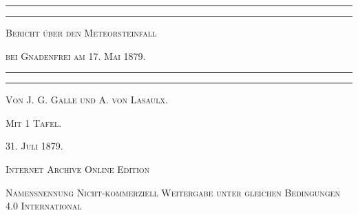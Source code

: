 \documentclass[a4paper, 11pt, oneside]{article}
\begin{document}
\begin{titlepage} %
	\centering %

	
	\rule{\textwidth}{1.6pt}\vspace*{-\baselineskip}\vspace*{2pt} %
	\rule{\textwidth}{0.4pt} %
	
	\vspace{1.5\baselineskip} %
	
	{\scshape\LARGE Bericht über den Meteorsteinfall}
	
	\vspace{1\baselineskip} %

	{\scshape\LARGE bei Gnadenfrei am 17. Mai 1879.}

	\vspace{1.5\baselineskip} %

	\rule{\textwidth}{0.4pt}\vspace*{-\baselineskip}\vspace{3.2pt} %
	\rule{\textwidth}{1.6pt} %
	
	\vspace{1\baselineskip} %
	
	
	{\scshape Von J. G. Galle und A. von Lasaulx.} %
	
	\vspace*{1\baselineskip} %
	
    {\scshape\small Mit 1 Tafel.} %
    
    \vspace*{\fill}

	\vspace{1\baselineskip}

	{\small\scshape 31. Juli 1879.}
	
	\vspace{0.5\baselineskip} %

    \scshape Internet Archive Online Edition  %
	
	{\scshape\small Namensnennung Nicht-kommerziell Weitergabe unter gleichen Bedingungen 4.0 International} %
\end{titlepage}
\setlength{\parskip}{1mm plus1mm minus1mm}
\clearpage
\tableofcontents
\clearpage
\end{document}
